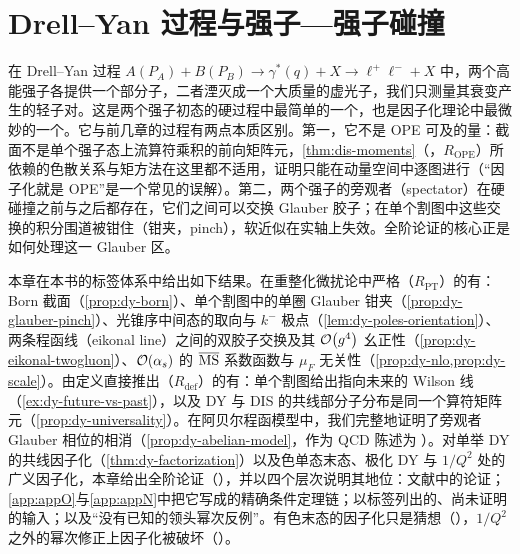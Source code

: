 \chapter{Drell--Yan 过程与强子—强子碰撞}\label{ch:dy}

在 Drell--Yan 过程 $A(P_A)+B(P_B)\to\gamma^*(q)+X\to\ell^+\ell^-+X$ 中，两个高能强子各提供一个部分子，二者湮灭成一个大质量的虚光子，我们只测量其衰变产生的轻子对。这是两个强子初态的硬过程中最简单的一个，也是因子化理论中最微妙的一个。它与前几章的过程有两点本质区别。第一，它不是 OPE 可及的量：截面不是单个强子态上流算符乘积的前向矩阵元，\cref{thm:dis-moments}（\tagR，$R_{\mathrm{OPE}}$）所依赖的色散关系与矩方法在这里都不适用，证明只能在动量空间中逐图进行（“因子化就是 OPE”是一个常见的误解）。第二，两个强子的旁观者（spectator）在硬碰撞之前与之后都存在，它们之间可以交换 Glauber 胶子；在单个割图中这些交换的积分围道被钳住（钳夹，pinch），软近似在实轴上失效。全阶论证的核心正是如何处理这一 Glauber 区。

本章在本书的标签体系中给出如下结果。在重整化微扰论中严格（$R_{\mathrm{PT}}$）的有：Born 截面（\cref{prop:dy-born}）、单个割图中的单圈 Glauber 钳夹（\cref{prop:dy-glauber-pinch}）、光锥序中间态的取向与 $k^-$ 极点（\cref{lem:dy-poles-orientation}）、两条程函线（eikonal line）之间的双胶子交换及其 $\mathcal{O}\!\left(g^4\right)$ 幺正性（\cref{prop:dy-eikonal-twogluon}）、$\mathcal{O}\!\left(\alpha_s\right)$ 的 $\overline{\mathrm{MS}}$ 系数函数与 $\mu_F$ 无关性（\cref{prop:dy-nlo,prop:dy-scale}）。由定义直接推出（$R_{\mathrm{def}}$）的有：单个割图给出指向未来的 Wilson 线（\cref{ex:dy-future-vs-past}），以及 DY 与 DIS 的共线部分子分布是同一个算符矩阵元（\cref{prop:dy-universality}）。在阿贝尔程函模型中，我们完整地证明了旁观者 Glauber 相位的相消（\cref{prop:dy-abelian-model}，作为 QCD 陈述为 \tagP）。对单举 DY 的共线因子化（\cref{thm:dy-factorization}）以及色单态末态、极化 DY 与 $1/Q^2$ 处的广义因子化，本章给出全阶论证（\tagA），并以四个层次说明其地位：文献中的论证；\cref{app:appO}与\cref{app:appN}中把它写成的精确条件定理链；以标签列出的、尚未证明的输入；以及“没有已知的领头幂次反例”。有色末态的因子化只是猜想（\tagC），$1/Q^2$ 之外的幂次修正上因子化被破坏（\tagV）。

